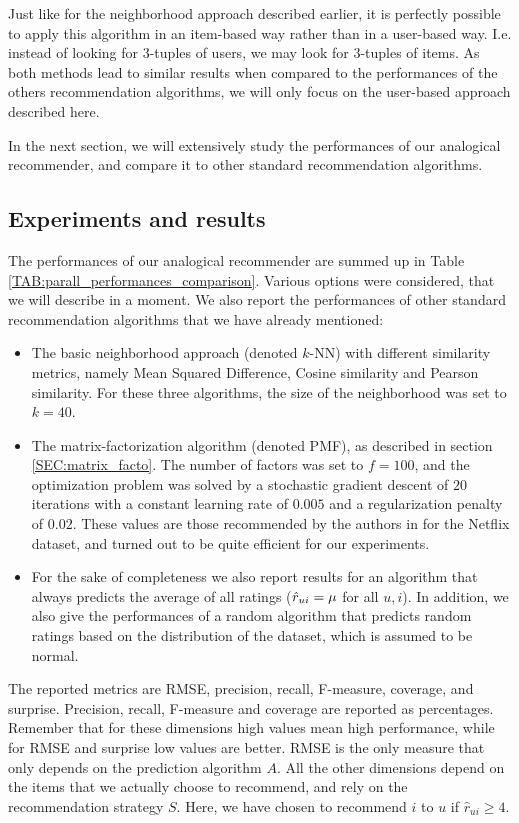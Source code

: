 Just like for the neighborhood approach described earlier, it is perfectly
possible to apply this algorithm in an item-based way rather
than in a user-based way. I.e. instead of looking for $3$-tuples of users, we
may look for $3$-tuples of items.  As both methods lead to similar results when
compared to
the performances of the others recommendation algorithms, we
will only focus on the user-based approach described here.

In the next section, we will extensively study the performances of our
analogical recommender, and compare it to other standard recommendation
algorithms.

\subsection{Experiments and results}
\label{SEC:experiments_analogical_reco_basic}

The performances of our analogical recommender are summed up in Table
\ref{TAB:parall_performances_comparison}. Various options were considered, that
we will describe in a moment. We also report the performances of other standard
recommendation algorithms that we have already mentioned:
\begin{itemize}
  \item The basic neighborhood approach (denoted $k$-NN) with different
    similarity metrics, namely Mean Squared Difference, Cosine similarity and
    Pearson similarity.  For these three algorithms, the size of the
    neighborhood was set to $k=40$.
  \item The matrix-factorization algorithm (denoted PMF), as described in section \ref{SEC:matrix_facto}.
    The number of factors was set to $f = 100$, and the optimization problem
    was solved by a stochastic gradient descent of $20$ iterations with
    a constant learning rate of $0.005$ and a regularization penalty of $0.02$.
    These values are those recommended by the authors in \cite{KorBel11} for the
    Netflix dataset, and turned out to be quite efficient for our experiments.
  \item For the sake of completeness we also report results for an algorithm
    that always predicts the average of all ratings ($\hat{r}_{ui} = \mu$ for all
    $u, i$). In addition, we also give the performances of a random algorithm
    that predicts random ratings based on the distribution of the dataset,
    which is assumed to be normal.
\end{itemize}

The reported metrics are RMSE, precision, recall, F-measure, coverage, and
surprise. Precision, recall, F-measure and coverage  are reported as
percentages. Remember that for these dimensions high values mean high
performance, while for RMSE and surprise low values are better.  RMSE is the
only measure that only depends on the prediction algorithm $A$. All the other
dimensions depend on the items that we actually choose to recommend, and
rely on the recommendation strategy $S$. Here, we have chosen to
recommend $i$ to $u$ if $\hat{r}_{ui} \geq 4$.

